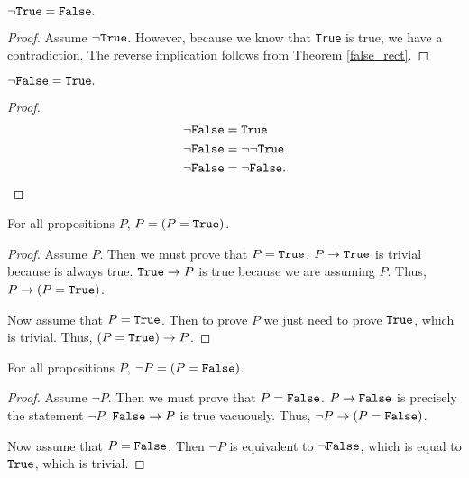 \documentclass[../math.tex]{subfiles}
\begin{document}
\begin{theorem} \label{not_true}
    $\neg \verb|True| = \verb|False|.$
\end{theorem}
\begin{proof}
    Assume $\neg \verb|True|$.  However, because we know that \verb|True| is
    true, we have a contradiction.  The reverse implication follows from Theorem
    \ref{false_rect}.
\end{proof}

\begin{theorem} \label{not_false}
    $\neg \verb|False| = \verb|True|.$
\end{theorem}
\begin{proof}
    \begin{align*}
        \neg \vtt{False} &= \vtt{True} \\
        \neg \vtt{False} &= \neg \neg \vtt{True} \\
        \neg \vtt{False} &= \neg \vtt{False}.
    \end{align*}
\end{proof}

\begin{theorem} \label{prop_eq_true}
    For all propositions $P$, $P = (P = \vtt{True})$.
\end{theorem}
\begin{proof}
    Assume $P$.  Then we must prove that $P = \vtt{True}$.  $P \rightarrow
    \vtt{True}$ is trivial because  is always true.  $\vtt{True}
    \rightarrow P$ is true because we are assuming $P$.  Thus, $P \rightarrow (P
    = \vtt{True})$.

    Now assume that $P = \vtt{True}$.  Then to prove $P$ we just need to prove
    $\vtt{True}$, which is trivial.  Thus, $(P = \vtt{True}) \rightarrow P$.
\end{proof}

\begin{theorem} \label{prop_eq_false}
    For all propositions $P$, $\neg P = (P = \vtt{False})$.
\end{theorem}
\begin{proof}
    Assume $\neg P$.  Then we must prove that $P = \vtt{False}$.  $P \rightarrow
    \vtt{False}$ is precisely the statement $\neg P$.  $\vtt{False} \rightarrow
    P$ is true vacuously.  Thus, $\neg P \rightarrow (P = \vtt{False})$.

    Now assume that $P = \vtt{False}$.  Then $\neg P$ is equivalent to $\neg
    \vtt{False}$, which is equal to $\vtt{True}$, which is trivial.
\end{proof}
\end{document}
